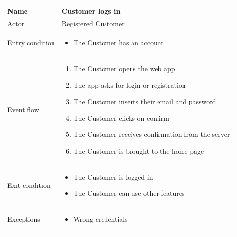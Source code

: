 \begin{table}[H]
    \begin{tabu} to \textwidth {|X|X[4]|}
        \hline
        Name            & Customer logs in           \\ \hline
        Actor           & Registered Customer        \\ \hline
        Entry condition & \begin{itemize}
            \item The Customer has an account
        \end{itemize} \\ \hline
        Event flow      & \begin{enumerate}
            \item The Customer opens the web app
            \item The app asks for login or registration
            \item The Customer inserts their email and password
            \item The Customer clicks on confirm
            \item The Customer receives confirmation from the server
            \item The Customer is brought to the home page
        \end{enumerate} \\ \hline
        Exit condition  & \begin{itemize}
            \item The Customer is logged in
            \item The Customer can use other features
        \end{itemize} \\ \hline
        Exceptions      & \begin{itemize}
            \item Wrong credentials
        \end{itemize} \\ \hline
    \end{tabu}
\end{table}

